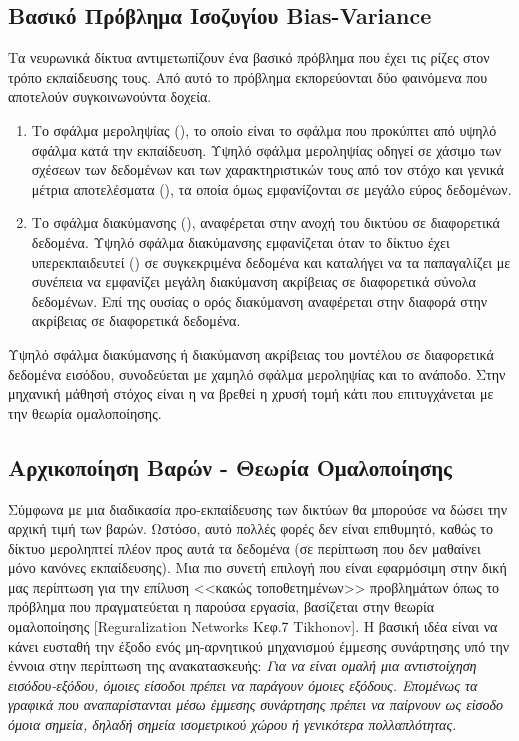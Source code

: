 \subsection{Βασικό Πρόβλημα Ισοζυγίου Bias-Variance}
Τα νευρωνικά δίκτυα αντιμετωπίζουν ένα βασικό πρόβλημα που έχει τις ρίζες στον τρόπο εκπαίδευσης τους. Από αυτό το πρόβλημα εκπορεύονται δύο φαινόμενα που αποτελούν συγκοινωνούντα δοχεία.
\begin{enumerate}
    \item Το σφάλμα μεροληψίας (), το οποίο είναι το σφάλμα που προκύπτει από υψηλό σφάλμα κατά την εκπαίδευση. Υψηλό σφάλμα μεροληψίας οδηγεί σε χάσιμο των σχέσεων των δεδομένων και των χαρακτηριστικών τους από τον στόχο και γενικά μέτρια αποτελέσματα (), τα οποία όμως εμφανίζονται σε μεγάλο εύρος δεδομένων.
    \item Το σφάλμα διακύμανσης (), αναφέρεται στην ανοχή του δικτύου σε διαφορετικά δεδομένα. Υψηλό σφάλμα διακύμανσης εμφανίζεται όταν το δίκτυο έχει υπερεκπαιδευτεί () σε συγκεκριμένα δεδομένα και καταλήγει να τα παπαγαλίζει με συνέπεια να εμφανίζει μεγάλη διακύμανση ακρίβειας σε διαφορετικά σύνολα δεδομένων. Επί της ουσίας ο ορός διακύμανση αναφέρεται στην διαφορά στην ακρίβειας σε διαφορετικά δεδομένα. 
\end{enumerate}
Υψηλό σφάλμα διακύμανσης ή διακύμανση ακρίβειας του μοντέλου σε διαφορετικά δεδομένα εισόδου, συνοδεύεται με χαμηλό σφάλμα μεροληψίας και το ανάποδο. Στην μηχανική μάθησή στόχος είναι η να βρεθεί η χρυσή τομή κάτι που επιτυγχάνεται με την θεωρία ομαλοποίησης. 
\subsection{Αρχικοποίηση Βαρών - Θεωρία Ομαλοποίησης}
\label{subsection:Initializatio/Reguralization}
    Σύμφωνα με \cite{lecun2015deep} μια διαδικασία προ-εκπαίδευσης των δικτύων θα μπορούσε να δώσει την αρχική τιμή των βαρών. Ωστόσο, αυτό πολλές φορές δεν είναι επιθυμητό, καθώς το δίκτυο μεροληπτεί πλέον προς αυτά τα δεδομένα (σε περίπτωση που δεν μαθαίνει μόνο κανόνες εκπαίδευσης). Μια πιο συνετή επιλογή που είναι εφαρμόσιμη στην δική μας περίπτωση για την επίλυση <<κακώς τοποθετημένων>> προβλημάτων όπως το πρόβλημα που πραγματεύεται η παρούσα εργασία, βασίζεται στην θεωρία ομαλοποίησης [Reguralization Networks \cite{haykin2009neural} Κεφ.7 Tikhonov]. 
    Η βασική ιδέα είναι να κάνει ευσταθή την έξοδο ενός μη-αρνητικού μηχανισμού έμμεσης συνάρτησης υπό την έννοια στην περίπτωση της ανακατασκευής:
    \emph{Για να είναι ομαλή μια αντιστοίχηση εισόδου-εξόδου, όμοιες είσοδοι πρέπει να παράγουν όμοιες εξόδους. Επομένως τα γραφικά που αναπαρίστανται μέσω έμμεσης συνάρτησης πρέπει να παίρνουν ως είσοδο όμοια σημεία, δηλαδή σημεία ισομετρικού χώρου ή γενικότερα πολλαπλότητας.}
    
